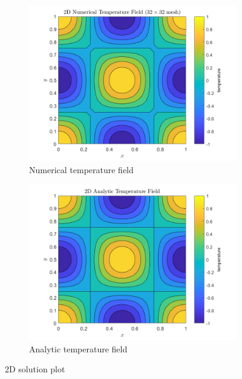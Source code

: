 \documentclass{article}
\begin{document}
\begin{figure}[ht]
    \centering
    \begin{subfigure}[t]{.5\textwidth}
        \centering
        \includegraphics[width=1.0\linewidth]{solution_plot2D.png}
        \caption{Numerical temperature field}
    \label{fig:2Dplot_numerical}
    \end{subfigure}%
    \begin{subfigure}[t]{.5\textwidth}
        \centering
        \includegraphics[width=1.0\linewidth]{solution_plot2D_exact.png}
        \caption{Analytic temperature field}
    \label{fig:2Dplot_exact}
    \end{subfigure}
    \caption{2D solution plot}
\label{fig:2Dplot}
\end{figure}
\end{document}
